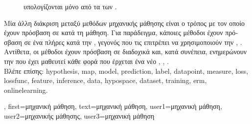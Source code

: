 {{\begin{figure}[H]
{{			\foreignlanguage{greek}{υπολογίζονται μόνο από τα}  \foreignlanguage{greek}{των} .}
			\label{fig_AlexMLBP_dict} }
		\end{figure}
		\foreignlanguage{greek}{Μία άλλη διάκριση μεταξύ μεθόδων μηχανικής μάθησης είναι ο τρόπος με τον οποίο έχουν πρόσβαση σε} 
		 \foreignlanguage{greek}{κατά τη μάθηση. Για παράδειγμα, κάποιες μέθοδοι έχουν πρόσβαση σε ένα πλήρες} 
		 \foreignlanguage{greek}{κατά την} , \foreignlanguage{greek}{γεγονός που τις επιτρέπει 
		να χρησιμοποιούν την}  \cite{MLBasics}, \cite{HastieWainwrightBook}. \foreignlanguage{greek}{Αντίθετα, οι 
		μέθοδοι}  \foreignlanguage{greek}{έχουν πρόσβαση σε}  
		\foreignlanguage{greek}{διαδοχικά και, κατά συνέπεια, ενημερώνουν την}  \foreignlanguage{greek}{που έχει 
		μαθευτεί κάθε φορά που έρχεται ένα νέο}  \cite{PredictionLearningGames}, \cite{HazanOCO}, \cite{Bottou99}.
		\\
	 	\foreignlanguage{greek}{Βλέπε επίσης:} \gls{hypothesis}, \gls{map}, \gls{model}, \gls{prediction}, \gls{label}, \gls{datapoint}, \gls{measure}, 
		\gls{loss}, \gls{lossfunc}, \gls{feature}, \gls{inference}, \gls{data}, \gls{hypospace}, \gls{dataset}, \gls{training}, \gls{erm}, \gls{onlinelearning}.},
	first={\foreignlanguage{greek}{μηχανική μάθηση}},
	text={\foreignlanguage{greek}{μηχανική μάθηση}},
	user1={\foreignlanguage{greek}{μηχανική μάθηση}}, %
	user2={\foreignlanguage{greek}{μηχανικής μά\-θη\-σης}}, %
	user3={\foreignlanguage{greek}{μηχανική μάθηση}} %
}

